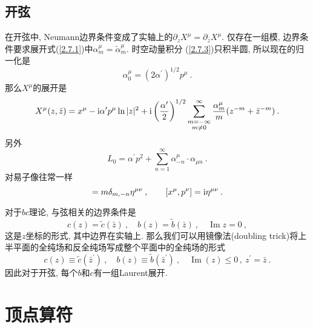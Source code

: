 \subsection*{ 开弦}
在开弦中, Neumann边界条件变成了实轴上的$\partial_z X^{\mu}=\partial_{\bar{z}} X^{\mu}$.
仅存在一组模, 边界条件要求展开式(\ref{2.7.1})中$\alpha_{m}^{\mu}=\tilde{\alpha}_{m}^{\mu}$. 时空动量积分 (\ref{2.7.3})只积半圆, 所以现在的归一化是
\begin{equation}
\alpha_{0}^{\mu}= (2 \alpha^{\prime})^{1 / 2} p^{\mu} \:. \label{2.7.25}
\end{equation}
那么$X^\mu$的展开是
\begin{equation}
X^{\mu}(z, \bar{z})=x^{\mu}- \mathrm{i} \alpha^{\prime} p^{\mu} \ln |z|^{2} + \mathrm{i}\left(\frac{\alpha^{\prime}}{2}\right)^{1 / 2} 
\sum_{\substack{m=-\infty  \\  m \neq 0}}^{\infty} \frac{\alpha_{m}^{\mu}}{m} (z^{-m}+\bar{z}^{-m}) \:. \label{2.7.26}
\end{equation}
另外
\begin{equation}
L_{0}=\alpha^{\prime} p^{2}+\sum_{n=1}^{\infty} \alpha_{-n}^{\mu}\cdot \alpha_{\mu n} \:. \label{2.7.27}
\end{equation}
对易子像往常一样
\begin{equation}
[\alpha_{m}^{\mu}, \alpha_{n}^{\nu}]=m \delta_{m,-n} \eta^{\mu \nu} \: , \qquad [x^{\mu}, p^{\nu}]= \mi \eta^{\mu \nu} \:. \label{2.7.28}
\end{equation}

对于$bc$理论, 与弦相关的边界条件是
\begin{equation}
c(z)=\tilde{c}(\bar{z})\: , \quad b(z)=\tilde{b}(\bar{z}) \:, \quad \operatorname{Im} z=0 \:,  \label{2.7.29}
\end{equation}
这是$z$坐标的形式, 其中边界在实轴上. 那么我们可以用镜像法(doubling trick)将上半平面的全纯场和反全纯场写成整个平面中的全纯场的形式
\begin{equation}
c(z) \equiv \tilde{c}(\bar{z}^{\prime})\:, \quad b(z) \equiv \tilde{b}(\bar{z}^{\prime})\:, \quad \operatorname{Im}(z) \leq 0\,,\: z^{\prime}=\bar{ z} \:.  \label{2.7.30}
\end{equation}
因此对于开弦, 每个$b$和$c$有一组Laurent展开.

\section{\texorpdfstring{顶点算符}{2.8 Vertex operators}}

